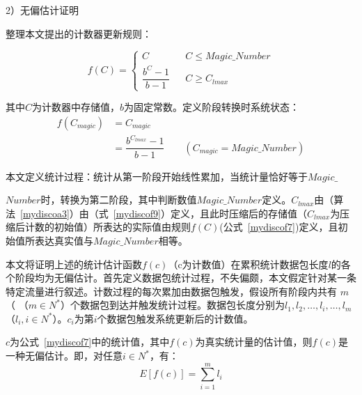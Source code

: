 2）无偏估计证明

整理本文提出的计数器更新规则：

\begin{equation} \label{mydiscof7}
 f(C)=\left\{
\begin{array}{rcl}
C         &      & {C \leq Magic\_Number} \\
\dfrac{b^C-1}{b-1}       &      & {C \geq C_{lmax}}
\end{array} \right. 
\end{equation}

其中$ C $为计数器中存储值，$ b $为固定常数。定义阶段转换时系统状态：
\begin{align}\label{mydiscof9}
f(C_{magic}) &= C_{magic} \nonumber \\
&=\dfrac{b^{C_{lmax}}-1}{b-1} \quad\quad (C_{magic} = Magic\_Number)
\end{align}

本文定义统计过程：统计从第一阶段开始线性累加，当统计量恰好等于$ Magic\_$

$Number $时，转换为第二阶段，其中判断数值$ Magic\_Number $定义。$ C_{lmax} $由（算法~\ref{mydiscoa3}）由（式~\ref{mydiscof9}）定义，且此时压缩后的存储值（$ C_{lmax} $为压缩后计数的初始值）所表达的实际值由规则$f(C)$(公式~\ref{mydiscof7})定义，且初始值所表达真实值与$ Magic\_Number $相等。

本文将证明上述的统计估计函数$f(c)$（c为计数值）在累积统计数据包长度$l$的各个阶段均为无偏估计。首先定义数据包统计过程，不失偏颇，本文假定针对某一条特定流量进行叙述。计数过程的每次累加由数据包触发，假设所有阶段内共有 $ m $ （ $（m\in N^{\ast} $）个数据包到达并触发统计过程。数据包长度分别为$l_1,l_2,\dots,l_i,\dots,l_m$（$ l_i,i\in N^{\ast} $）。$ c_i $为第$ i $个数据包触发系统更新后的计数值。

\begin{theorem}%
	$ c $为公式~\ref{mydiscof7}中的统计值，其中$ f(c) $为真实统计量的估计值，则$ f(c) $是一种无偏估计。即，对任意$ i\in N^{\ast} $，有：
\begin{equation} \label{mydiscof8}
E[f(c)]=\sum ^{m}_{i=1}l_{i}
\end{equation}	
\end{theorem}


